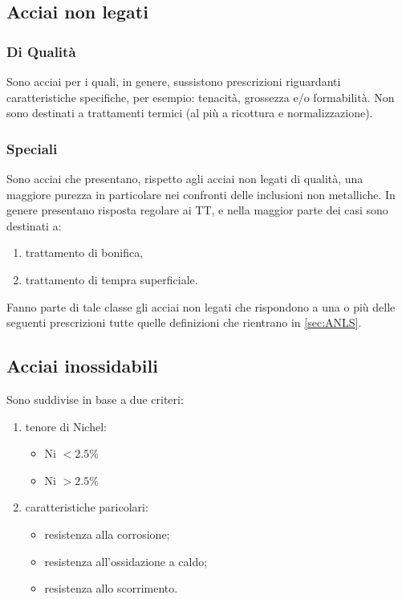 \subsection{Acciai non legati}
\begin{multicols}{2}[]
\subsubsection{Di Qualità}
Sono acciai per i quali, in genere, sussistono prescrizioni riguardanti caratteristiche specifiche, per esempio: tenacità, grossezza e/o formabilità.
Non sono destinati a trattamenti termici (al più a ricottura e normalizzazione).
\columnbreak
\subsubsection{Speciali}
Sono acciai che presentano, rispetto agli acciai non legati di qualità, una maggiore purezza in particolare nei confronti delle inclusioni non metalliche.
In genere presentano risposta regolare ai \ac{TT}, e nella maggior parte dei casi sono destinati a:
\begin{enumerate}
\item trattamento di bonifica,
\item trattamento di tempra superficiale.
\end{enumerate}
Fanno parte di tale classe gli acciai non legati che rispondono a una o più delle seguenti prescrizioni tutte quelle definizioni che rientrano in \ref{sec:ANLS}. 
\end{multicols}

\subsection{Acciai inossidabili}
Sono suddivise in base a due criteri:
\begin{enumerate}
\item tenore di Nichel:
\begin{itemize}
\item Ni $<2.5\%$
\item Ni $>2.5\%$
\end{itemize}
\item caratteristiche paricolari:
\begin{itemize}
\item resistenza alla corrosione;
\item resistenza all'ossidazione a caldo;
\item resistenza allo scorrimento.
\end{itemize}
\end{enumerate}
\newpage
